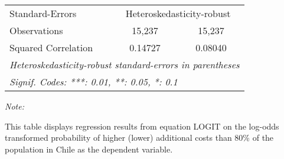 \begin{table}[htbp!]
\begin{adjustbox}{width = 1\textwidth, max height = 0.95\textheight, center}
\begin{threeparttable}[b]
\begin{tabular}{lcc}
            \midrule 
            Standard-Errors & \multicolumn{2}{c}{Heteroskedasticity-robust} \\ 
            Observations         & 15,237        & 15,237\\  
            Squared Correlation  & 0.14727       & 0.08040\\  
            \midrule \midrule
            \multicolumn{3}{l}{\emph{Heteroskedasticity-robust standard-errors in parentheses}}\\
            \multicolumn{3}{l}{\emph{Signif. Codes: ***: 0.01, **: 0.05, *: 0.1}}\\
         \end{tabular}
         
         \begin{tablenotes}\item \medskip \textit{Note:}
            \item This table displays regression results from equation LOGIT on the log-odds transformed probability of higher (lower) additional costs than 80\% of the population in Chile as the dependent variable. 
         \end{tablenotes}
      \end{threeparttable}
   \end{adjustbox}
\end{table}


